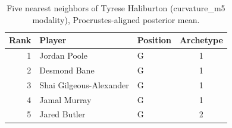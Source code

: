 \begin{table}[htbp]
  \centering\small
  \begin{tabular}{rllc}
    \toprule
    Rank & Player & Position & Archetype \\
    \midrule
    1 & Jordan Poole & G & 1 \\
    2 & Desmond Bane & G & 1 \\
    3 & Shai Gilgeous-Alexander & G & 1 \\
    4 & Jamal Murray & G & 1 \\
    5 & Jared Butler & G & 2 \\
    \bottomrule
  \end{tabular}
  \caption{Five nearest neighbors of Tyrese Haliburton (curvature_m5 modality), Procrustes-aligned posterior mean.}
  \label{tab:Tyrese_Haliburton_neighbors_curvature_m5}
\end{table}

